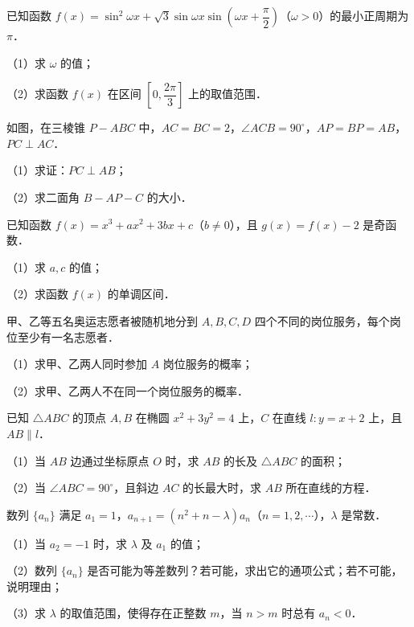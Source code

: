 \begin{question}
已知函数 $f(x)=\sin^2\omega x+\sqrt3\sin\omega x\sin\left(\omega x+\dfrac{\pi}{2}\right)$（$\omega>0$）的最小正周期为 $\pi$．

（1）求 $\omega$ 的值；

（2）求函数 $f(x)$ 在区间 $\left[0,\dfrac{2\pi}{3}\right]$ 上的取值范围．

\Needspace{0.4\textheight}
\end{question}
\begin{question}
如图，在三棱锥 $P-ABC$ 中，$AC=BC=2$，$\angle ACB=90^\circ$，$AP=BP=AB$，$PC\perp AC$．
\nopagebreak[4]
\begin{center}\end{center}
\nopagebreak[4]
（1）求证：$PC\perp AB$；

（2）求二面角 $B-AP-C$ 的大小．

\end{question}
\begin{question}
已知函数 $f(x)=x^3+ax^2+3bx+c$（$b\neq0$），且 $g(x)=f(x)-2$ 是奇函数．

（1）求 $a,c$ 的值；

（2）求函数 $f(x)$ 的单调区间．

\end{question}
\begin{question}
甲、乙等五名奥运志愿者被随机地分到 $A,B,C,D$ 四个不同的岗位服务，每个岗位至少有一名志愿者．

（1）求甲、乙两人同时参加 $A$ 岗位服务的概率；

（2）求甲、乙两人不在同一个岗位服务的概率．

\end{question}
\begin{question}
已知 $\triangle ABC$ 的顶点 $A,B$ 在椭圆 $x^2+3y^2=4$ 上，$C$ 在直线 $l:y=x+2$ 上，且 $AB\parallel l$．

（1）当 $AB$ 边通过坐标原点 $O$ 时，求 $AB$ 的长及 $\triangle ABC$ 的面积；

（2）当 $\angle ABC=90^\circ$，且斜边 $AC$ 的长最大时，求 $AB$ 所在直线的方程．

\end{question}
\begin{question}
数列 $\{a_n\}$ 满足 $a_1=1$，$a_{n+1}=(n^2+n-\lambda)a_n$（$n=1,2,\cdots$），$\lambda$ 是常数．

（1）当 $a_2=-1$ 时，求 $\lambda$ 及 $a_1$ 的值；

（2）数列 $\{a_n\}$ 是否可能为等差数列？若可能，求出它的通项公式；若不可能，说明理由；

（3）求 $\lambda$ 的取值范围，使得存在正整数 $m$，当 $n>m$ 时总有 $a_n<0$．

\end{question}